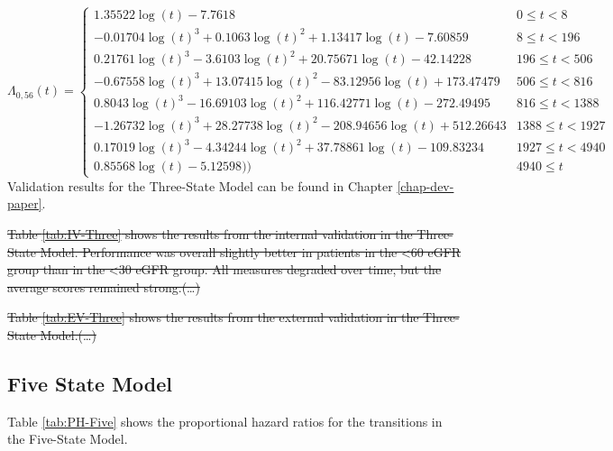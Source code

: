 \documentclass[12pt,PhD,twoside,openright]{muthesis}
\begin{document}
\begin{equation}
\Lambda_{0,56}(t)=\begin{cases} 1.35522\log(t)-7.7618 & 0 \le t < 8 \\ -0.01704\log(t)^3+0.1063\log(t)^2+1.13417\log(t)-7.60859 & 8 \le t < 196 \\ 0.21761\log(t)^3-3.6103\log(t)^2+20.75671\log(t)-42.14228 & 196 \le t < 506 \\ -0.67558\log(t)^3+13.07415\log(t)^2-83.12956\log(t)+173.47479 & 506 \le t < 816 \\ 0.8043\log(t)^3-16.69103\log(t)^2+116.42771\log(t)-272.49495 & 816 \le t < 1388 \\ -1.26732\log(t)^3+28.27738\log(t)^2-208.94656\log(t)+512.26643 & 1388 \le t < 1927 \\ 0.17019\log(t)^3-4.34244\log(t)^2+37.78861\log(t)-109.83234 & 1927 \le t < 4940 \\ 0.85568\log(t)-5.12598)) & 4940 \le t \label{eq:CH-Three-56}\end{cases}
\end{equation}
Validation results for the Three-State Model can be found in Chapter \ref{chap-dev-paper}.

\sout{Table \ref{tab:IV-Three} shows the results from the internal validation in the Three-State Model. Performance was overall slightly better in patients in the \textless60 eGFR group than in the \textless30 eGFR group. All measures degraded over time, but the average scores remained strong.(\ldots)}

\sout{Table \ref{tab:EV-Three} shows the results from the external validation in the Three-State Model.(\ldots)}

\hypertarget{five-state-model}{%
\subsection{Five State Model}\label{five-state-model}}

Table \ref{tab:PH-Five} shows the proportional hazard ratios for the transitions in the Five-State Model.
\end{document}
